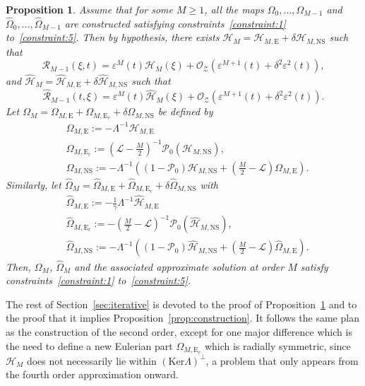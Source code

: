 \documentclass[11pt,reqno,a4paper]{amsart}
\def\eps{\varepsilon}
\newcommand{\cH}{\mathcal{H}}
\newcommand{\cL}{\mathcal{L}}
\newcommand{\cO}{\mathcal{O}}
\newcommand{\cP}{\mathcal{P}}
\newcommand{\cR}{\mathcal{R}}
\newcommand{\cZ}{\mathcal{Z}}
\newcommand{\1}{\mathbbm{1}}
\newtheorem{proposition}{Proposition}[section]
\theoremstyle{definition}
\theoremstyle{definition}
\numberwithin{equation}{section}
\begin{document}
\begin{proposition}\label{prop:iterative}
    Assume that for some $M \ge 1$, all the maps $\Omega_0,\ldots,\Omega_{M-1}$ and $\widehat{\Omega}_0,\ldots,\widehat{\Omega}_{M-1}$ are constructed satisfying constraints~\ref{constraint:1} to~\ref{constraint:5}. Then by hypothesis, there exists $\cH_{M} = \cH_{M,\mathrm{E}} + \delta\cH_{M,\mathrm{NS}}$ such that
    \begin{equation}
        \cR_{M-1} (\xi,t) = \eps^{M}(t) \cH_{M}(\xi) + \cO_\cZ(\eps^{M+1}(t) + \delta^2 \eps^2(t)),
    \end{equation}
    and $\widehat{\cH}_{M} = \widehat{\cH}_{M,\mathrm{E}} + \delta\widehat{\cH}_{M,\mathrm{NS}}$ such that
    \begin{equation}
        \widehat{\cR}_{M-1}(t,\xi) = \eps^{M}(t) \widehat{\cH}_{M}(\xi) + \cO_\cZ(\eps^{M+1}(t) + \delta^2 \eps^2(t)).
    \end{equation}
    Let $\Omega_{M} = \Omega_{M,\mathrm{E}} + \Omega_{M,\mathrm{E}_r}  + \delta\Omega_{M,\mathrm{NS}}$ be defined by
    \begin{align}
        & \Omega_{M,\mathrm{E}} := - \Lambda^{-1} \cH_{M,\mathrm{E}} \\
        & \Omega_{M,\mathrm{E}_r} := \left(\cL - \frac{M}{2} \right)^{-1} \cP_0(\cH_{M,\mathrm{NS}}),\\
        & \Omega_{M,\mathrm{NS}} := - \Lambda^{-1} \left( (1-\cP_0)\cH_{M,\mathrm{NS}} + \left(\frac{M}{2}-\cL\right) \Omega_{M,\mathrm{E}}\right).
    \end{align}
    Similarly, let $\widehat{\Omega}_{M} =  \widehat{\Omega}_{M,\mathrm{E}} + \widehat{\Omega}_{M,\mathrm{E}_r} + \delta\widehat{\Omega}_{M,\mathrm{NS}}$ with
    \begin{align}
        & \widehat{\Omega}_{M,\mathrm{E}} := - \frac{1}{\gamma}\Lambda^{-1} \widehat{\cH}_{M,\mathrm{E}} \\
        & \widehat{\Omega}_{M,\mathrm{E}_r} := -\left(\frac{M}{2} - \cL\right)^{-1} \cP_0(\widehat{\cH}_{M,\mathrm{NS}}),\\
        & \widehat{\Omega}_{M,\mathrm{NS}} := - \Lambda^{-1} \left( (1-\cP_0)\widehat{\cH}_{M,\mathrm{NS}} + \left(\frac{M}{2}-\cL\right) \widehat{\Omega}_{M,\mathrm{E}}\right).
    \end{align}
    Then, $\Omega_{M}$, $\widehat{\Omega}_{M}$ and the associated approximate solution at order $M$ satisfy constraints~\ref{constraint:1} to~\ref{constraint:5}.
\end{proposition}
The rest of Section~\ref{sec:iterative} is devoted to the proof of Proposition~\ref{prop:iterative} and to the proof that it implies Proposition~\ref{prop:construction}. It follows the same plan as the construction of the second order, except for one major difference which is the need to define a new Eulerian part $\Omega_{M,\mathrm{E}_r}$ which is radially symmetric, since $\cH_{M}$ does not necessarily lie within $(\mathrm{Ker} \Lambda)^\perp$, a problem that only appears from the fourth order approximation onward.
\end{document}
